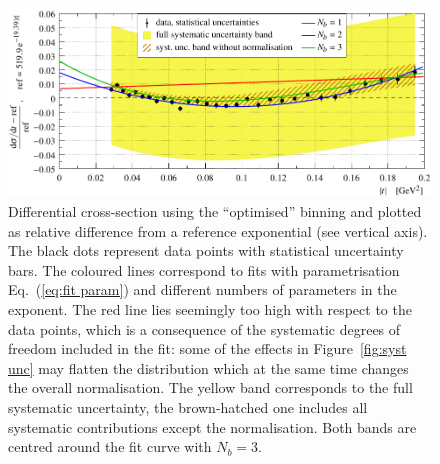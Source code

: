 \begin{figure}
\vskip-5mm
\begin{center}
\includegraphics{fig/t_dist_rel_with_fits.pdf}
\vskip-4mm
\caption{%
Differential cross-section using the ``optimised'' binning and plotted as relative difference from a reference exponential (see vertical axis). The black dots represent data points with statistical uncertainty bars. The coloured lines correspond to fits with parametrisation Eq.~(\ref{eq:fit param}) and different numbers of parameters in the exponent. The red line lies seemingly too high with respect to the data points, which is a consequence of the systematic degrees of freedom included in the fit: some of the effects in Figure~\ref{fig:syst unc} may flatten the distribution which at the same time changes the overall normalisation. The yellow band corresponds to the full systematic uncertainty, the brown-hatched one includes all systematic contributions except the normalisation. Both bands are centred around the fit curve with $N_b = 3$.
}
\label{fig:data rel ob}
\end{center}
\vskip-2mm
\end{figure}



